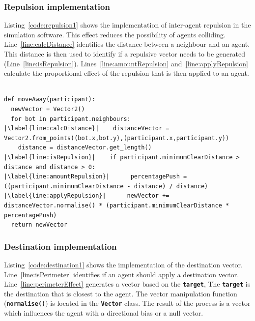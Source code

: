 \subsubsection{Repulsion implementation}
Listing~\ref{code:repulsion1} shows the implementation of inter-agent repulsion in the simulation software. This effect reduces the possibility of agents colliding. Line~\ref{line:calcDistance} identifies the distance between a neighbour and an agent. This distance is then used to identify if a repulsive vector needs to be generated (Line~\ref{line:isRepulsion}). Lines~\ref{line:amountRepulsion} and~\ref{line:applyRepulsion} calculate the proportional effect of the repulsion that is then applied to an agent.

\lstset{language=Python,
basicstyle=\tiny,
numbers=left, 
numberstyle=\tiny,
captionpos=b,
frame=single,
breaklines=true,
caption=Repulsion code,
escapechar=|
} %
\begin{lstlisting}[label={code:repulsion1}]  % Start your code-block

def moveAway(participant):
  newVector = Vector2()
  for bot in participant.neighbours:
|\label{line:calcDistance}|    distanceVector = Vector2.from_points((bot.x,bot.y),(participant.x,participant.y))
    distance = distanceVector.get_length()
|\label{line:isRepulsion}|    if participant.minimumClearDistance > distance and distance > 0:
|\label{line:amountRepulsion}|      percentagePush = ((participant.minimumClearDistance - distance) / distance)
|\label{line:applyRepulsion}|      newVector += distanceVector.normalise() * (participant.minimumClearDistance * percentagePush)
  return newVector
\end{lstlisting}

\subsubsection{Destination implementation}
Listing~\ref{code:destination1} shows the implementation of the destination vector. Line~\ref{line:isPerimeter} identifies if an agent should apply a destination vector. Line~\ref{line:perimeterEffect} generates a vector based on the \texttt{\textbf{target}}, The \texttt{\textbf{target}} is the destination that is closest to the agent. The vector manipulation function (\texttt{\textbf{normalise()}}) is located in the \texttt{\textbf{Vector}} class. The result of the process is a vector which influences the agent with a directional bias or a null vector.

